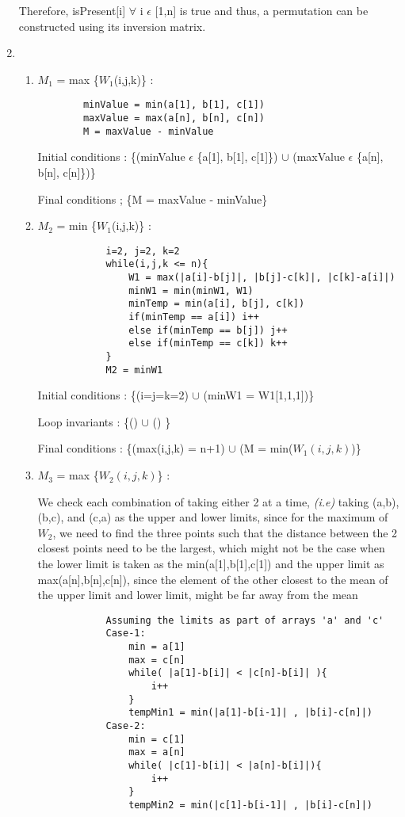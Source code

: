 \documentclass[12pt]{article}
\begin{document}
\begin{enumerate}
    Therefore, isPresent[i] $\forall$ i $\epsilon$ [1,n] is true and thus, a permutation can be constructed using its inversion matrix.
    
    \item\begin{enumerate}
        \item $M_1$ = max \{$W_1$(i,j,k)\} :
        \begin{verbatim}
        minValue = min(a[1], b[1], c[1])
        maxValue = max(a[n], b[n], c[n])
        M = maxValue - minValue
        \end{verbatim}
        Initial conditions : \{(minValue $\epsilon$ \{a[1], b[1], c[1]\}) $\cup$ (maxValue $\epsilon$ \{a[n], b[n], c[n]\})\} 
        
        Final conditions ; \{M = maxValue - minValue\}
        \item$M_2$ = min \{$W_1$(i,j,k)\} : 
        \begin{verbatim}
            i=2, j=2, k=2
            while(i,j,k <= n){
                W1 = max(|a[i]-b[j]|, |b[j]-c[k]|, |c[k]-a[i]|)
                minW1 = min(minW1, W1)
                minTemp = min(a[i], b[j], c[k])
                if(minTemp == a[i]) i++
                else if(minTemp == b[j]) j++
                else if(minTemp == c[k]) k++
            }
            M2 = minW1
        \end{verbatim}
        Initial conditions : \{(i=j=k=2) $\cup$ (minW1 = W1[1,1,1])\}
        
        Loop invariants : \{() $\cup$ () \}
        
        Final conditions : \{(max(i,j,k) = n+1) $\cup$ (M = min($W_1(i,j,k)$)\}
        \item $M_3$ = max \{$W_2(i,j,k)$\} :
        
        We check each combination of taking either 2 at a time, \textit{(i.e)} taking (a,b), (b,c), and (c,a) as the upper and lower limits, since for the maximum of $W_2$, we need to find the three points such that the distance between the 2 closest points need to be the largest, which might not be the case when the lower limit is taken as the min(a[1],b[1],c[1]) and the upper limit as max(a[n],b[n],c[n]), since the element of the other closest to the mean of the upper limit and lower limit, might be far away from the mean 
        \begin{verbatim}
            Assuming the limits as part of arrays 'a' and 'c'
            Case-1: 
                min = a[1]
                max = c[n]
                while( |a[1]-b[i]| < |c[n]-b[i]| ){
                    i++
                }
                tempMin1 = min(|a[1]-b[i-1]| , |b[i]-c[n]|)
            Case-2:
                min = c[1]
                max = a[n]
                while( |c[1]-b[i]| < |a[n]-b[i]|){
                    i++
                }
                tempMin2 = min(|c[1]-b[i-1]| , |b[i]-c[n]|)
                

\end{verbatim}
\end{enumerate}
\end{enumerate}
\end{document}
